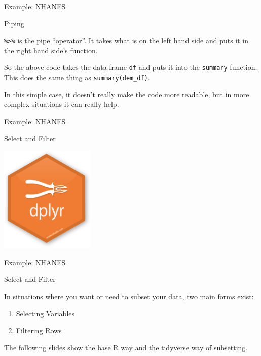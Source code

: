 \documentclass[ignorenonframetext,]{beamer}
\newenvironment{Shaded}{\begin{snugshade}}{\end{snugshade}}
\newcommand{\StringTok}[1]{\textcolor[rgb]{0.31,0.60,0.02}{{#1}}}
\newcommand{\NormalTok}[1]{{#1}}
\providecommand{\tightlist}{%
\setlength{\itemsep}{0pt}\setlength{\parskip}{0pt}}
\begin{document}
\begin{frame}[fragile]{Example: NHANES}

\begin{block}{Piping}

\texttt{\%\textgreater{}\%} is the pipe ``operator''. It takes what is
on the left hand side and puts it in the right hand side's function.

\begin{Shaded}
\end{Shaded}

So the above code takes the data frame \texttt{df} and puts it into the
\texttt{summary} function. This does the same thing as
\texttt{summary(dem\_df)}.

In this simple case, it doesn't really make the code more readable, but
in more complex situations it can really help.

\end{block}

\end{frame}

\begin{frame}{Example: NHANES}

\begin{block}{Select and Filter}

\centering  \includegraphics[height=2in]{Figures/dplyr_logo.png}

\end{block}

\end{frame}

\begin{frame}{Example: NHANES}

\begin{block}{Select and Filter}

In situations where you want or need to subset your data, two main forms
exist:

\begin{enumerate}
\def\labelenumi{\arabic{enumi}.}
\tightlist
\item
  Selecting Variables
\item
  Filtering Rows
\end{enumerate}

The following slides show the base R way and the tidyverse way of
subsetting.

\end{block}

\end{frame}
\end{document}
